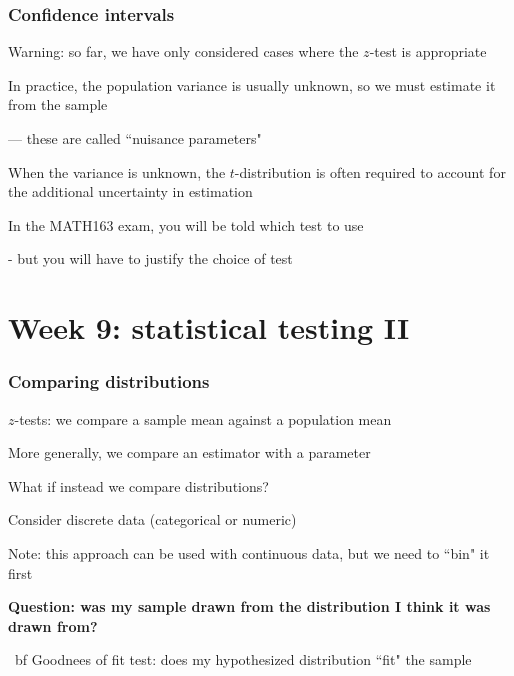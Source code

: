 \documentclass[t,8pt]{beamer}%
\begin{document}
\begin{frame}
	\frametitle{Confidence intervals}
Warning: so far, we have only considered cases where the $z$-test is appropriate \par
In practice, the population variance is usually unknown, so we must estimate it from the sample \par
— these are called ``nuisance parameters" \par
When the variance is unknown, the $t$-distribution is often required to account for the additional uncertainty in estimation \par
In the MATH163 exam, you will be told which test to use \par
- but you will have to justify the choice of test
\end{frame}


\section{Week 9: statistical testing II}

\begin{frame}
	\frametitle{Comparing distributions}
    $z$-tests: we compare a sample mean against a population mean \par
    More generally, we compare an estimator with a parameter \par
    What if instead we compare distributions? \par
    Consider discrete data (categorical or numeric) \par
    Note: this approach can be used with continuous data, but we need to ``bin" it first \par
    {\bf Question: was my sample drawn from the distribution I think it was drawn from?} \par
    {\ bf Goodnees of fit test: does my hypothesized distribution ``fit" the sample}
\end{frame}
\end{document}
